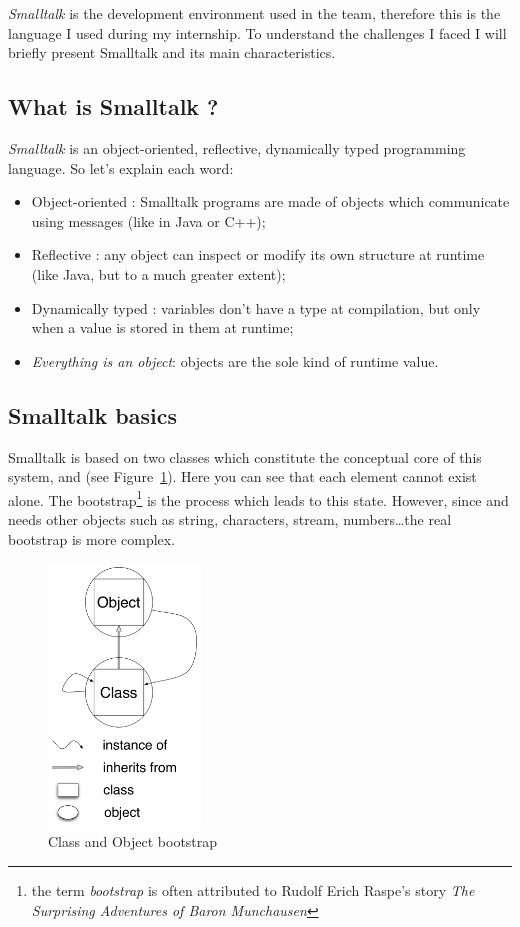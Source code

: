 \emph{\gls{Smalltalk}} is the development environment used in the team, therefore this is the language I used during my internship. To understand the challenges I faced I will briefly present \gls{Smalltalk} and its main characteristics.

\subsection {What is Smalltalk ?}

\emph{\gls{Smalltalk}} is an object-oriented, reflective, dynamically typed programming language. So let's explain each word:


\begin{itemize}
	\item Object-oriented : \gls{Smalltalk} programs are made of objects which communicate using messages (like in Java or C++);
	\item Reflective : any object can inspect or modify its own structure at runtime (like Java, but to a much greater extent);
	\item Dynamically typed : variables don't have a type at compilation, but only when a value is stored in them at runtime;
	\item \textit{Everything is an object}: objects are the sole kind of runtime value.
\end{itemize}

\subsection{Smalltalk basics}

\gls{Smalltalk} is based on two classes which constitute the conceptual core of this system,  and  (see Figure~\ref{ClassObjectBootStrap}). Here you can see that each element cannot exist alone. The bootstrap\footnote{the term \emph{bootstrap} is often attributed to Rudolf Erich Raspe's story \emph{The Surprising Adventures of Baron Munchausen}} is the process which leads to this state. However, since  and  needs other objects such as string, characters, stream, numbers\dots the real bootstrap is more complex.

\begin{figure}[h]
	\centering\includegraphics[height = 7cm]{figures/BootStrap}
	\caption{Class and Object bootstrap}
	\label{ClassObjectBootStrap}
\end{figure}
	
